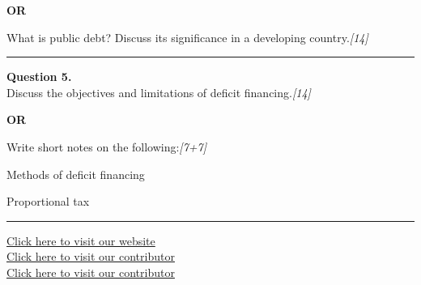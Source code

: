 \documentclass[11pt,a4paper]{article}
\newcommand{\pts}[1]{\hfill   \textit{[#1]}}
\begin{document}
\centerline{   \textbf{OR}}

What is public debt? Discuss its significance in a developing country.\pts{14}

\medskip\rule{\linewidth}{0.2pt}




\noindent   \textbf{Question 5.} \\
Discuss the objectives and limitations of deficit financing.\pts{14}

\centerline{   \textbf{OR}}

Write short notes on the following:\pts{7+7}

\begin{parts}
  \item Methods of deficit financing
  \item Proportional tax
\end{parts}

\vfill
\rule{\linewidth}{0.4pt}

\begin{center}\small
\href{https://bhu-exam.vercel.app/}{Click here to visit our website}\\[4pt]
\href{https://me-aryan.vercel.app/}{Click here to visit our contributor}\\[4pt]
\href{https://quashan-me.vercel.app/}{Click here to visit our contributor}
\end{center}
\end{document}
